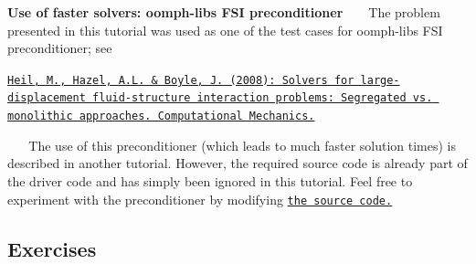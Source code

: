 \begin{DoxyEnumerate}
\begin{DoxyEnumerate}
\end{DoxyEnumerate}
\item {\bfseries Use of faster solvers\+: {\ttfamily oomph-\/lib\textquotesingle{}s} F\+SI preconditioner} ~\newline
~\newline
 The problem presented in this tutorial was used as one of the test cases for {\ttfamily oomph-\/lib\textquotesingle{}s} F\+SI preconditioner; see ~\newline
~\newline
 \begin{center} \href{http://www.maths.man.ac.uk/~mheil/oomph_lib_additional_material/HeilHazelBoyleCompMech/HeilHazelBoyleCompMech.pdf}{\tt Heil, M., Hazel, A.\+L. \& Boyle, J. (2008)\+: Solvers for large-\/displacement fluid-\/structure interaction problems\+: Segregated vs. monolithic approaches. Computational Mechanics.} \end{center}  ~\newline
~\newline
 The use of this preconditioner (which leads to much faster solution times) is described in another tutorial. However, the required source code is already part of the driver code and has simply been ignored in this tutorial. Feel free to experiment with the preconditioner by modifying \href{../../../../demo_drivers/interaction/fsi_channel_with_leaflet/fsi_channel_with_leaflet.cc}{\tt the source code.}
\end{DoxyEnumerate}\hypertarget{index_ex}{}\subsection{Exercises}\label{index_ex}

